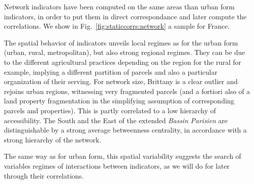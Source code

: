 \documentclass[11pt]{article}
\begin{document}
Network indicators have been computed on the same areas than urban form indicators, in order to put them in direct correspondance and later compute the correlations. We show in Fig.~\ref{fig:staticcorrs:network} a sample for France.

The spatial behavior of indicators unveils local regimes as for the urban form (urban, rural, metropolitan), but also strong regional regimes. They can be due to the different agricultural practices depending on the region for the rural for example, implying a different partition of parcels and also a particular organization of their serving. For network size, Brittany is a clear outlier and rejoins urban regions, witnessing very fragmented parcels (and a fortiori also of a land property fragmentation in the simplifying assumption of corresponding parcels and properties). This is partly correlated to a low hierarchy of accessibility. The South and the East of the extended \emph{Bassin Parisien} are distinguishable by a strong average betweenness centrality, in accordance with a strong hierarchy of the network.

The same way as for urban form, this spatial variability suggests the search of variables regimes of interactions between indicators, as we will do for later through their correlations.



\end{document}
